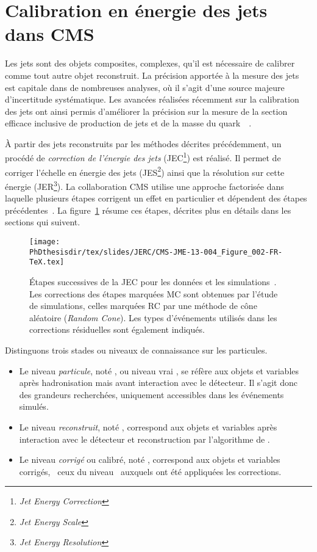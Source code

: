 \section{Calibration en énergie des jets dans CMS}\label{chapter-JERC-section-CMS}
Les jets sont des objets composites, complexes, qu'il est nécessaire de calibrer comme tout autre objet reconstruit.
La précision apportée à la mesure des jets est capitale dans de nombreuses analyses, où il s'agit d'une source majeure d'incertitude systématique.
Les avancées réalisées récemment sur la calibration des jets ont ainsi permis d'améliorer la précision sur la mesure de la section efficace inclusive de production de jets et de la masse du quark~\quarkt~\cite{JERC_RunI}.
\par À partir des jets reconstruits par les méthodes décrites précédemment, un procédé de \emph{correction de l'énergie des jets} (JEC\footnote{\emph{Jet Energy Correction}}) est réalisé.
Il permet de corriger l'échelle en énergie des jets (JES\footnote{\emph{Jet Energy Scale}}) ainsi que la résolution sur cette énergie (JER\footnote{\emph{Jet Energy Resolution}}).
La collaboration CMS utilise une approche factorisée dans laquelle plusieurs étapes corrigent un effet en particulier et dépendent des étapes précédentes~\cite{JERC_RunI}.
La figure~\ref{fig-CMS-JME-13-004_Figure_002-TeX} résume ces étapes, décrites plus en détails dans les sections qui suivent.
\begin{figure}[h]
\centering
\texttt{[image: \\PhDthesisdir/tex/slides/JERC/CMS-JME-13-004\_Figure\_002-FR-TeX.tex]}
\caption{Étapes successives de la JEC pour les données et les simulations~\cite{JERC_RunI}. Les corrections des étapes marquées \og MC \fg{} sont obtenues par l'étude de simulations, celles marquées \og RC \fg{} par une méthode de cône aléatoire (\emph{Random Cone}). Les types d'événements utilisés dans les corrections résiduelles sont également indiqués.}
\label{fig-CMS-JME-13-004_Figure_002-TeX}
\end{figure}
\par Distinguons trois stades ou \og niveaux \fg{} de connaissance sur les particules.
\begin{itemize}
\item Le niveau \emph{particule}, noté \ptcl, ou niveau \og vrai \fg{}, se réfère aux objets et variables après hadronisation mais avant interaction avec le détecteur. Il s'agit donc des grandeurs recherchées, uniquement accessibles dans les événements simulés.
\item Le niveau \emph{reconstruit}, noté \reco, correspond aux objets et variables après interaction avec le détecteur et reconstruction par l'algorithme de \PF.
\item Le niveau \emph{corrigé} ou calibré, noté \cali, correspond aux objets et variables corrigés, \ie\ ceux du niveau \reco\ auxquels ont été appliquées les corrections.
\end{itemize}
